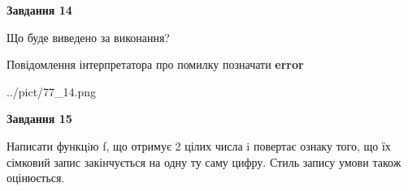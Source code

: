 \documentclass[11pt, ukrainian]{article}
\begin{document}
{\begin {large}
{\begin {center}\textbf{Завдання 14}\end {center}}\par
Що буде виведено за виконання? \par
Повідомлення інтерпретатора про помилку позначати \textbf{error}

\begin{center}
	{../pict/77_14.png}
\end{center}
\newpage

{\begin {center}\textbf{Завдання 15}\end {center}}\par

Написати функцiю f, що отримує 2 цілих числа i повертає ознаку того, що їх сімковий запис закінчується на одну ту саму цифру. Стиль запису умови також оцінюється.\par
\newpage

\end {large}}
\end{document}
